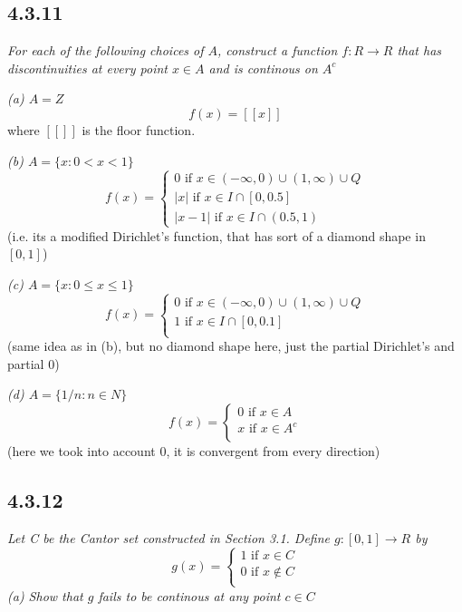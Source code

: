 \documentclass[11pt,oneside,titlepage]{book}
\begin{document}
\subsection*{4.3.11}
\textit{For each of the following choices of $A$, construct a function
  $f: R \to R$ that has discontinuities at every point $x \in A$ and is
  continous on $A^c$}

\textit{(a) $A = Z$}
$$f(x) = [[x]]$$
where $[[]]$ is the floor function.

\textit{(b) $A = \{x: 0 < x < 1\}$}
\begin{equation}
  f(x) =
  \begin{cases}
    0 \text{ if } x \in (-\infty, 0) \cup (1, \infty) \cup Q \\
    |x| \text{ if } x \in I \cap [0, 0.5] \\
    |x - 1| \text{ if } x \in I \cap (0.5, 1)
  \end{cases}
\end{equation}
(i.e. its a modified Dirichlet's function, that has sort of a diamond shape
in $[0, 1]$)

\textit{(c) $A = \{x: 0 \leq x \leq 1\}$}
\begin{equation}
  f(x) =
  \begin{cases}
    0 \text{ if } x \in (-\infty, 0) \cup (1, \infty) \cup Q \\
    1 \text{ if } x \in I \cap [0, 0.1] \\
  \end{cases}
\end{equation}
(same idea as in (b), but no diamond shape here, just the partial Dirichlet's
and partial 0)

\textit{(d) $A = \{1/n: n \in N\}$}
\begin{equation}
  f(x) =
  \begin{cases}
    0 \text{ if } x \in A \\
    x \text{ if } x \in A^c \\
  \end{cases}
\end{equation}
(here we took into account 0, it is convergent from every direction)

\subsection*{4.3.12}
\textit{Let C be the Cantor set constructed in Section 3.1. Define
$g: [0, 1] \to R$ by}
\begin{equation}
  g(x) =
  \begin{cases}
    1 \text{ if } x \in C \\
    0 \text{ if } x \not \in C \\
  \end{cases}
\end{equation}
\textit{(a) Show that $g$ fails to be continous at any point $c \in C$}
\end{document}
